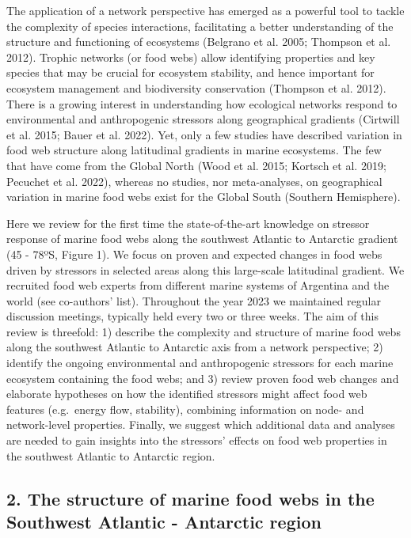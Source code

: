 \documentclass[
]{article}
\begin{document}
The application of a network perspective has emerged as a powerful tool
to tackle the complexity of species interactions, facilitating a better
understanding of the structure and functioning of ecosystems (Belgrano
et al. 2005; Thompson et al. 2012). Trophic networks (or food webs)
allow identifying properties and key species that may be crucial for
ecosystem stability, and hence important for ecosystem management and
biodiversity conservation (Thompson et al. 2012). There is a growing
interest in understanding how ecological networks respond to
environmental and anthropogenic stressors along geographical gradients
(Cirtwill et al. 2015; Bauer et al. 2022). Yet, only a few studies have
described variation in food web structure along latitudinal gradients in
marine ecosystems. The few that have come from the Global North (Wood et
al. 2015; Kortsch et al. 2019; Pecuchet et al. 2022), whereas no
studies, nor meta-analyses, on geographical variation in marine food
webs exist for the Global South (Southern Hemisphere).

Here we review for the first time the state-of-the-art knowledge on
stressor response of marine food webs along the southwest Atlantic to
Antarctic gradient (45 - 78ºS, Figure 1). We focus on proven and
expected changes in food webs driven by stressors in selected areas
along this large-scale latitudinal gradient. We recruited food web
experts from different marine systems of Argentina and the world (see
co-authors' list). Throughout the year 2023 we maintained regular
discussion meetings, typically held every two or three weeks. The aim of
this review is threefold: 1) describe the complexity and structure of
marine food webs along the southwest Atlantic to Antarctic axis from a
network perspective; 2) identify the ongoing environmental and
anthropogenic stressors for each marine ecosystem containing the food
webs; and 3) review proven food web changes and elaborate hypotheses on
how the identified stressors might affect food web features (e.g.~energy
flow, stability), combining information on node- and network-level
properties. Finally, we suggest which additional data and analyses are
needed to gain insights into the stressors' effects on food web
properties in the southwest Atlantic to Antarctic region.

\subsection{2. The structure of marine food webs in the Southwest
Atlantic - Antarctic
region}\label{the-structure-of-marine-food-webs-in-the-southwest-atlantic---antarctic-region}
\end{document}
